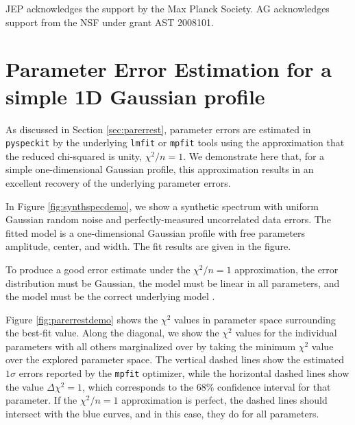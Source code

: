 \documentclass[twocolumn,linenumbers]{aastex63}
\newcommand{\pyspeckit}{\texttt{pyspeckit}\xspace}
\begin{document}
\acknowledgments
%
JEP acknowledges the support by the Max Planck Society. 
AG acknowledges support from the NSF under grant AST 2008101.





\appendix
\section{Parameter Error Estimation for a simple 1D Gaussian profile}
\label{appendix:parerrest}
As discussed in Section \ref{sec:parerrest}, parameter errors are estimated in
\pyspeckit by the underlying \texttt{lmfit} or \texttt{mpfit} tools using the
approximation that the reduced chi-squared is unity, $\chi^2/n=1$.  We
demonstrate here that, for a simple one-dimensional Gaussian profile, this
approximation results in an excellent recovery of the
underlying parameter errors.

In Figure \ref{fig:synthspecdemo}, we show a synthetic spectrum with uniform
Gaussian random noise and perfectly-measured uncorrelated data errors.
The fitted model is a one-dimensional Gaussian profile with free parameters
amplitude, center, and width.  The fit results are given in the figure.

To produce a good error estimate under the $\chi^2/n=1$ approximation, the error
distribution must be Gaussian, the model must be
linear in all parameters, and the model must be the correct underlying model
\citep{Andrae2010b}.

Figure \ref{fig:parerrestdemo} shows the $\chi^2$ values in parameter space
surrounding the best-fit value.  Along the diagonal, we show the $\chi^2$
values for the individual parameters with all others marginalized over
by taking the minimum $\chi^2$ value over the explored parameter space.  The vertical
dashed lines show the estimated $1\sigma$ errors reported by the \texttt{mpfit}
optimizer, while the
horizontal dashed lines show the value $\Delta\chi^2=1$, which corresponds to
the 68\% confidence interval for that parameter.  If the $\chi^2/n=1$
approximation is perfect, the dashed lines should intersect with the blue curves, and in this case, they do for all parameters.  
\end{document}
